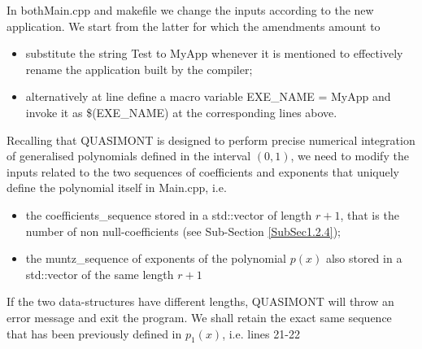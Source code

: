 \documentclass[a4paper, twosided]{book}
\begin{document}
\noindent
In both\colorbox{poliGrayBlue}{Main.cpp} and  \colorbox{poliGrayBlue}{makefile} we change the inputs according to the new application. We start from the latter for which the amendments amount to

\begin{itemize}
    \item substitute the string \colorbox{poliGrayBlue}{Test} to \colorbox{poliGrayBlue}{MyApp} whenever it is mentioned to effectively rename the application built by the compiler;
    \item alternatively at line define a macro variable \colorbox{poliGrayBlue}{EXE\_NAME = MyApp} and invoke it as \colorbox{poliGrayBlue}{\$(EXE\_NAME)} at the corresponding lines above.
\end{itemize}

\noindent
Recalling that QUASIMONT is designed to perform precise numerical integration of generalised polynomials defined in the interval $(0,1)$, we need to modify the inputs related to the two sequences of coefficients and exponents that uniquely define the polynomial itself in \colorbox{poliGrayBlue}{Main.cpp}, i.e.

\newpage
\begin{itemize}
    \item the \colorbox{poliGrayBlue}{coefficients\_sequence} stored in a \colorbox{poliGrayBlue}{std::vector} of length $r+1$, that is the number of non null-coefficients (see Sub-Section \ref{SubSec1.2.4});
    \item the \colorbox{poliGrayBlue}{muntz\_sequence} of exponents of the polynomial $p(x)$ also stored in a \colorbox{poliGrayBlue}{std::vector} of the same length $r+1$
\end{itemize}

\noindent
If the two data-structures have different lengths, QUASIMONT will throw an error message and exit the program. We shall retain the exact same sequence that has been previously defined in $p_1(x)$, i.e. lines \colorbox{poliGrayBlue}{21-22}

\vspace{0.25cm}
\vspace{0.5cm}
\end{document}
